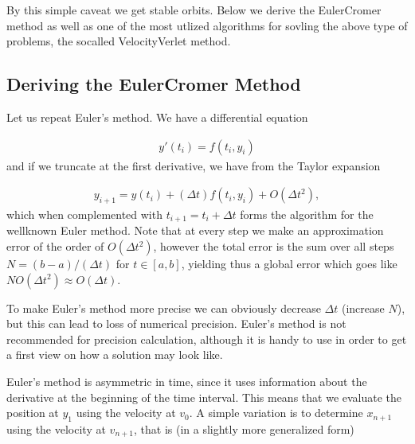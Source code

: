 \documentclass[letterpaper,10pt,english]{sphinxmanual}
\begin{document}
By this simple caveat we get stable orbits.
Below we derive the Euler\sphinxhyphen{}Cromer method as well as one of the most utlized algorithms for sovling the above type of problems, the so\sphinxhyphen{}called Velocity\sphinxhyphen{}Verlet method.


\subsection{Deriving the Euler\sphinxhyphen{}Cromer Method}
\label{\detokenize{chapter3:deriving-the-euler-cromer-method}}
Let us repeat Euler’s method.
We have a differential equation




\begin{equation*}
\begin{split}
\begin{equation}
y'(t_i)=f(t_i,y_i)   
\label{_auto13} \tag{13}
\end{equation}
\end{split}
\end{equation*}
and if we truncate at the first derivative, we have from the Taylor expansion




\begin{equation*}
\begin{split}
\begin{equation}
y_{i+1}=y(t_i) + (\Delta t) f(t_i,y_i) + O(\Delta t^2), \label{eq:euler} \tag{14}
\end{equation}
\end{split}
\end{equation*}
which when complemented with \(t_{i+1}=t_i+\Delta t\) forms
the algorithm for the well\sphinxhyphen{}known Euler method.
Note that at every step we make an approximation error
of the order of \(O(\Delta t^2)\), however the total error is the sum over all
steps \(N=(b-a)/(\Delta t)\) for \(t\in [a,b]\), yielding thus a global error which goes like
\(NO(\Delta t^2)\approx O(\Delta t)\).

To make Euler’s method more precise we can obviously
decrease \(\Delta t\) (increase \(N\)), but this can lead to loss of numerical precision.
Euler’s method is not recommended for precision calculation,
although it is handy to use in order to get a first
view on how a solution may look like.

Euler’s method is asymmetric in time, since it uses information about the derivative at the beginning
of the time interval. This means that we evaluate the position at \(y_1\) using the velocity
at \(v_0\). A simple variation is to determine \(x_{n+1}\) using the velocity at
\(v_{n+1}\), that is (in a slightly more generalized form)
\end{document}
